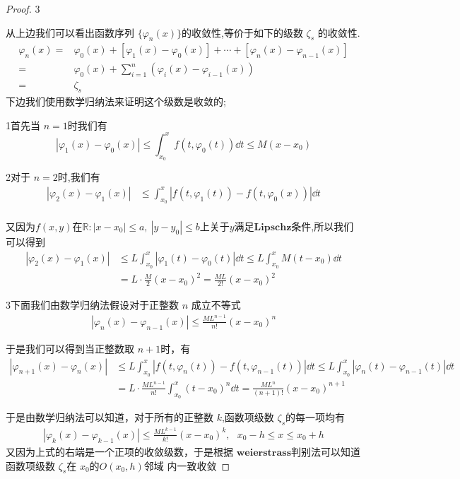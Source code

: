 \begin{proof}{\sf \color{orange} 3}\par
    从上边我们可以看出函数序列 $\{\varphi_n(x)\}$的收敛性,等价于如下的级数 $\zeta_s$ 的收敛性.
    \begin{align*}
        \varphi_n(x)
        =&\varphi_0(x) + [\varphi_1(x) - \varphi_0(x)] + \cdots + [\varphi_{n}(x)-\varphi_{n-1}(x)]\\
        =&\varphi_0(x) + \sum_{i=1}^{n}{\left(\varphi_{i}(x)-\varphi_{i-1}(x)\right)}\\
        =&\zeta_s
    \end{align*}
    下边我们使用数学归纳法来证明这个级数是收敛的;
    
    \noindent\num{1}\quad 首先当 $n=1$时我们有
    \[
        |\varphi_1(x)-\varphi_0(x)|\le \int_{x_0}^{x}{f(t, \varphi_0(t)) \dd t} \le M(x-x_0)   
    \]

    \noindent\num{2}\quad 对于 $n=2$时,我们有
    \begin{align*}
        |\varphi_2(x)-\varphi_1(x)|&\le \int_{x_0}^{x}{\left|f(t, \varphi_1(t))-f(t, \varphi_0(x)) \right|\dd t} \\
    \end{align*}

    又因为$f(x, y)$在$\mathbb{R}:|x-x_0|\le a,~ |y-y_0|\le b$上关于$y$满足$\mathbf{Lipschz}$条件,所以我们可以得到
    \begin{align*}
        \left|\varphi_2(x)-\varphi_1(x)\right|
        &\le L \int_{x_0}^{x}{\left|\varphi_1(t)-\varphi_0(t)\right|\dd t}
          \le L \int_{x_0}^{x}{M(t-x_0) \dd t}\\
        & = L\cdot \frac{M}{2}(x-x_0)^2
          = \frac{ML}{2!}(x-x_0)^2
    \end{align*}

    \noindent\num{3}\quad 下面我们由数学归纳法假设对于正整数 $n$ 成立不等式
    \begin{align*}
        \left|\varphi_n(x)-\varphi_{n-1}(x)\right|\le \frac{ML^{n-1}}{n!}(x-x_0)^n
    \end{align*}

    于是我们可以得到当正整数取 $n+1$时，有
    \begin{align*}
        \left|\varphi_{n+1}(x)-\varphi_n(x)\right|
        &\le L \int_{x_0}^{x}{\left|f(t, \varphi_n(t)) - f(t, \varphi_{n-1}(t))\right|\dd t}
          \le L \int_{x_0}^{x}{\left|\varphi_n(t)-\varphi_{n-1}(t)\right| \dd t}\\
        & = L\cdot \frac{ML^{n-1}}{n!}\int_{x_0}^{x}{(t-x_0)^n \dd t}
          = \frac{ML^{n}}{(n+1)!}(x-x_0)^{n+1}
    \end{align*}

    于是由数学归纳法可以知道，对于所有的正整数 $k$,函数项级数 $\zeta_s$的每一项均有
    \begin{align*}
        \left|\varphi_{k}(x)-\varphi_{k-1}(x)\right|\le \frac{ML^{k-1}}{k!}(x-x_0)^{k}, ~~~x_0-h \le x\le x_0 +h
    \end{align*}
    又因为上式的右端是一个正项的收敛级数，于是根据 $\mathbf{weierstrass}$判别法可以知道函数项级数 $\zeta_s$在 ${x_0}$的$O(x_0, h)$邻域
    内一致收敛
\end{proof}


